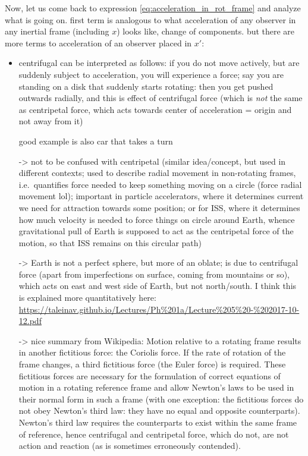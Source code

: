 \documentclass[../class_mech_main.tex]{subfiles}
\begin{document}
Now, let us come back to expression \eqref{eq:acceleration_in_rot_frame} and analyze what is going on. first term is analogous to what acceleration of any observer in any inertial frame (including $x$) looks like, change of components. but there are more terms to acceleration of an observer placed in $x'$:
\begin{itemize}
    \item centrifugal can be interpreted as follows: if you do not move actively, but are suddenly subject to acceleration, you will experience a force; say you are standing on a disk that suddenly starts rotating: then you get pushed outwards radially, and this is effect of centrifugal force (which is \emph{not} the same as centripetal force, which acts towards center of acceleration = origin and not away from it)
    
    good example is also car that takes a turn
    
    -> not to be confused with centripetal (similar idea/concept, but used in different contexts; used to describe radial movement in non-rotating frames, i.e.~quantifies force needed to keep something moving on a circle (force radial movement lol); important in particle accelerators, where it determines current we need for attraction towards some position; or for ISS, where it determines how much velocity is needed to force things on circle around Earth, whence gravitational pull of Earth is supposed to act as the centripetal force of the motion, so that ISS remains on this circular path)

    -> Earth is not a perfect sphere, but more of an oblate; is due to centrifugal force (apart from imperfections on surface, coming from mountains or so), which acts on east and west side of Earth, but not north/south. I think this is explained more quantitatively here: \url{https://taleinav.github.io/Lectures/Ph%201a/Lecture%205%20-%202017-10-12.pdf}


    -> nice summary from Wikipedia: Motion relative to a rotating frame results in another fictitious force: the Coriolis force. If the rate of rotation of the frame changes, a third fictitious force (the Euler force) is required. These fictitious forces are necessary for the formulation of correct equations of motion in a rotating reference frame and allow Newton's laws to be used in their normal form in such a frame (with one exception: the fictitious forces do not obey Newton's third law: they have no equal and opposite counterparts). Newton's third law requires the counterparts to exist within the same frame of reference, hence centrifugal and centripetal force, which do not, are not action and reaction (as is sometimes erroneously contended).



\end{itemize}
\end{document}
